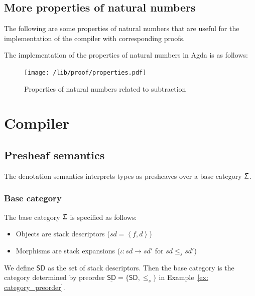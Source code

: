 \documentclass[12pt,a4paper]{report}
\theoremstyle{definition}
\newcommand{\ang}[1]{\left\langle #1 \right\rangle}
\begin{document}
    \subsection{More properties of natural numbers}
    The following are some properties of natural numbers that are useful for the implementation of the compiler with corresponding proofs.

    The implementation of the properties of natural numbers in Agda is as follows:
    \begin{figure}[H]
        \centering
        \texttt{[image: /lib/proof/properties.pdf]}
        \caption{Properties of natural numbers related to subtraction}
        \label{fig: properties_subtraction}
    \end{figure}


    

    \section{Compiler}
    \subsection{Presheaf semantics}
    The denotation semantics interprets types as presheaves over a base category $\Upsigma$. 
    \subsubsection{Base category}
    The base category $\Upsigma$ is specified as follows:
    \begin{itemize}
        \item Objects are stack descriptors ($sd = \ang{f, d}$)
        \item Morphisms are stack expansions ($\iota : sd \to sd'$ for $sd \leq_s sd'$) 
    \end{itemize}
    We define $\mathsf{SD}$ as the set of stack descriptors. Then the base category is the category determined by preorder $\underline{\mathsf{SD}} = \{\mathsf{SD}, \leq_s\}$ in Example~\ref{ex: category_preorder}.
\end{document}
